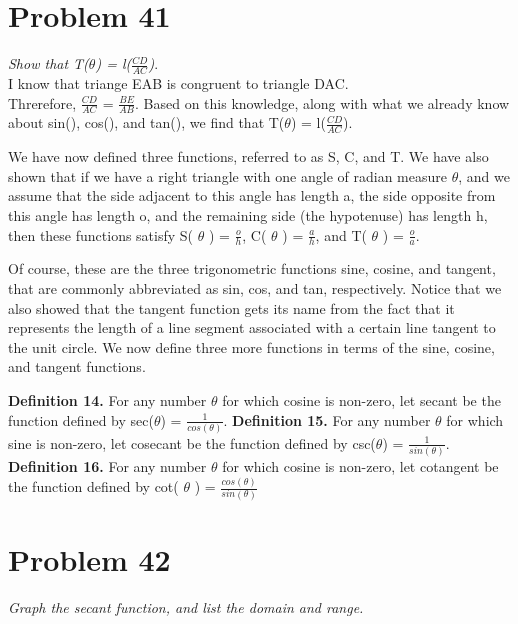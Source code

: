 \documentclass[11pt]{article} %
\newcommand\tab[1][1cm]{\hspace*{#1}}
\begin{document}
{\section{Problem 41}
\textit{Show that T($\theta$) = l($\frac{CD}{AC}$)}.
\\ \tab
I know that triange EAB is congruent to triangle DAC. \\Threrefore, $\frac{CD}{AC}$ = $\frac{BE}{AB}$. Based on this knowledge, along with what we already know about sin(), cos(), and tan(), we find that T($\theta$) = l($\frac{CD}{AC}$).

We have now defined three functions, referred to as S, C, and T. 
We have also shown that if we have a right triangle with one angle of radian measure $\theta$,
 and we assume that the side adjacent to this angle has length a, the side opposite from this angle has length o, 
 and the remaining side (the hypotenuse) has length h, then these functions satisfy S( $\theta$ ) = $\frac{o}{h}$, C( $\theta$ ) = $\frac{a}{h}$, and T( $\theta$ ) = $\frac{o}{a}$. 
 
Of course, these are the three trigonometric functions sine, cosine, and tangent, that are commonly abbreviated as sin, cos, and tan, respectively. Notice that we also showed that the tangent function gets its name from the fact that it represents the length of a line segment associated with a certain line tangent to the unit circle. We now define three more functions in terms of the sine, cosine, and tangent functions.

\textbf{Definition 14.} For any number $\theta$ for which cosine is non-zero, let secant be the function defined by sec($\theta$) = $\frac{1}{cos(\theta)}$.
\textbf{Definition 15.} For any number $\theta$ for which sine is non-zero, let cosecant be the function defined by csc($\theta$) = $\frac{1}{sin(\theta)}$.
\textbf{Definition 16.} For any number $\theta$ for which cosine is non-zero, let cotangent be the function defined by cot( $\theta$ ) = $\frac{cos(\theta)}{sin(\theta)}$
\section{Problem 42}
\textit{Graph the secant function, and list the domain and range.}
\\

}
\end{document}
